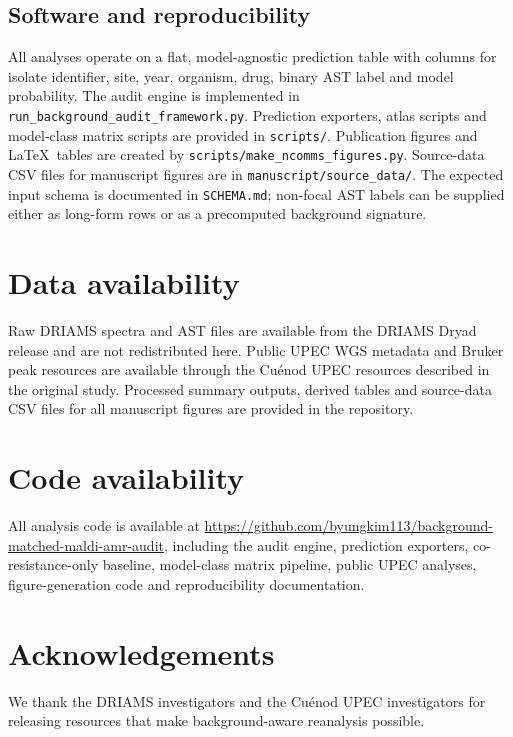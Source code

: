 \documentclass[11pt]{article}
\begin{document}
\subsection*{Software and reproducibility}

All analyses operate on a flat, model-agnostic prediction table with columns for isolate identifier, site, year, organism, drug, binary AST label and model probability. The audit engine is implemented in \texttt{run\_background\_audit\_framework.py}. Prediction exporters, atlas scripts and model-class matrix scripts are provided in \texttt{scripts/}. Publication figures and \LaTeX\ tables are created by \texttt{scripts/make\_ncomms\_figures.py}. Source-data CSV files for manuscript figures are in \texttt{manuscript/source\_data/}. The expected input schema is documented in \texttt{SCHEMA.md}; non-focal AST labels can be supplied either as long-form rows or as a precomputed background signature.

\section*{Data availability}

Raw DRIAMS spectra and AST files are available from the DRIAMS Dryad release\cite{driamsdryad} and are not redistributed here. Public UPEC WGS metadata and Bruker peak resources are available through the Cu\'{e}nod UPEC resources described in the original study\cite{cuenod2023papgii}. Processed summary outputs, derived tables and source-data CSV files for all manuscript figures are provided in the repository.

\section*{Code availability}

All analysis code is available at \url{https://github.com/byungkim113/background-matched-maldi-amr-audit}, including the audit engine, prediction exporters, co-resistance-only baseline, model-class matrix pipeline, public UPEC analyses, figure-generation code and reproducibility documentation.

\section*{Acknowledgements}

We thank the DRIAMS investigators and the Cu\'{e}nod UPEC investigators for releasing resources that make background-aware reanalysis possible.
\end{document}
